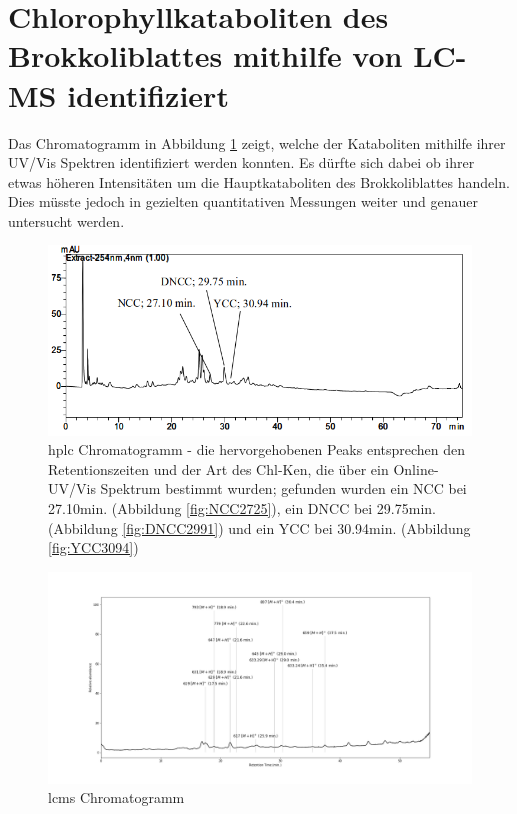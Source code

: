 \section{Chlorophyllkataboliten des Brokkoliblattes mithilfe von LC-MS identifiziert} \label{sec:ChlKatabolitenBrokkoli}

Das Chromatogramm in Abbildung \ref{fig:HPLCChromatogramm} zeigt, welche der Kataboliten mithilfe ihrer UV/Vis Spektren identifiziert werden konnten. Es dürfte sich dabei ob ihrer etwas höheren Intensitäten um die Hauptkataboliten des Brokkoliblattes handeln. Dies müsste jedoch in gezielten quantitativen Messungen weiter und genauer untersucht werden.

\begin{figure}[!htbp]
  \includegraphics[width=\textwidth]{figures/Kapitel6/keineReaktion/VWA_HPLC_Chromatogramm_keineReaktion.png}
  \caption[HPLC Chromatogramm vor der Reaktion, Quelle: Author]{\gls{hplc} Chromatogramm - die hervorgehobenen Peaks entsprechen den Retentionszeiten und der Art des \gls{Chl-K}en, die über ein Online-UV/Vis Spektrum bestimmt wurden; gefunden wurden ein \gls{NCC} bei 27.10min. (Abbildung \ref{fig:NCC2725}), ein DNCC bei 29.75min. (Abbildung \ref{fig:DNCC2991}) und ein YCC bei 30.94min. (Abbildung \ref{fig:YCC3094})}
  \label{fig:HPLCChromatogramm}
\end{figure}

\begin{figure}[!htbp]
  \centering
  \includegraphics[width=1\textwidth]{figures/Kapitel6/keineReaktion/Kuerbis_Analyse_keineReaktion2_Ganzes_Spektrum.png}
  \caption[LC-MS Chromatogramm vor der Reaktion, Quelle: Author]{\gls{lcms} Chromatogramm}
  \label{fig:LCMSChromatogramm}
\end{figure}

